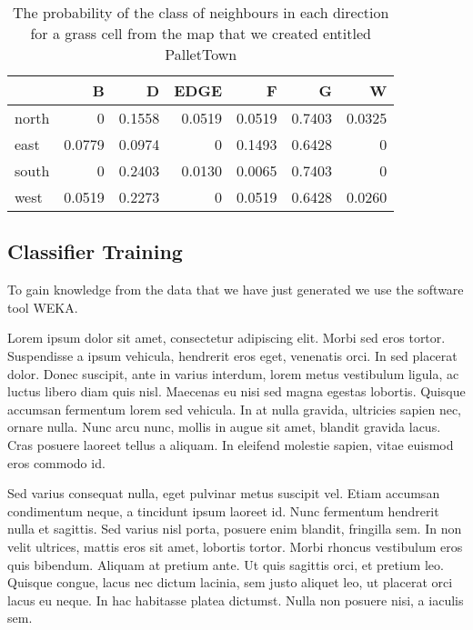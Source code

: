 \documentclass[preprint,5p,times,twocolumn]{elsarticle}
\begin{document}
\begin{table}[h]
\small
\begin{tabular}{ l | r r r r r r }
              & B      & D      & EDGE   & F      & G      & W \\
    \hline
    north     & 0      & 0.1558 & 0.0519 & 0.0519 & 0.7403 & 0.0325\\
    east      & 0.0779 & 0.0974 & 0      & 0.1493 & 0.6428 & 0\\
    south     & 0      & 0.2403 & 0.0130 & 0.0065 & 0.7403 & 0\\
    west      & 0.0519 & 0.2273 & 0      & 0.0519 & 0.6428 & 0.0260\\
\end{tabular}
\caption{The probability of the class of neighbours in each direction for a
    grass cell from the map that we created entitled PalletTown} 
\end{table}


\subsection{Classifier Training}
\label{process:training}

To gain knowledge from the data that we have just generated we use the software tool WEKA\cite{Hall2009}.

Lorem ipsum dolor sit amet, consectetur adipiscing elit. Morbi sed eros tortor.
Suspendisse a ipsum vehicula, hendrerit eros eget, venenatis orci. In sed
placerat dolor. Donec suscipit, ante in varius interdum, lorem metus vestibulum
ligula, ac luctus libero diam quis nisl. Maecenas eu nisi sed magna egestas
lobortis. Quisque accumsan fermentum lorem sed vehicula. In at nulla gravida,
ultricies sapien nec, ornare nulla. Nunc arcu nunc, mollis in augue sit amet,
blandit gravida lacus. Cras posuere laoreet tellus a aliquam. In eleifend
molestie sapien, vitae euismod eros commodo id.

Sed varius consequat nulla, eget pulvinar metus suscipit vel. Etiam accumsan
condimentum neque, a tincidunt ipsum laoreet id. Nunc fermentum hendrerit nulla
et sagittis. Sed varius nisl porta, posuere enim blandit, fringilla sem. In non
velit ultrices, mattis eros sit amet, lobortis tortor. Morbi rhoncus vestibulum
eros quis bibendum. Aliquam at pretium ante. Ut quis sagittis orci, et pretium
leo. Quisque congue, lacus nec dictum lacinia, sem justo aliquet leo, ut
placerat orci lacus eu neque. In hac habitasse platea dictumst. Nulla non
posuere nisi, a iaculis sem.
\end{document}
